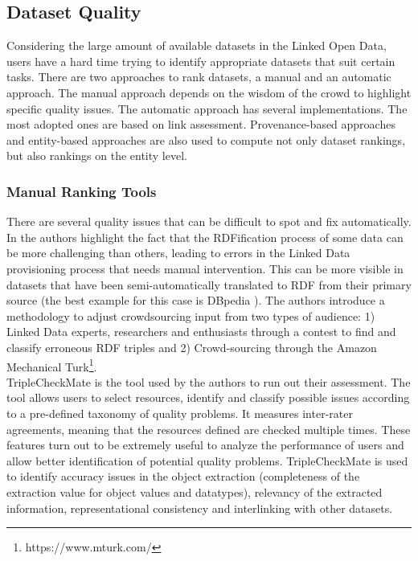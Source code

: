 \documentclass[onecolumn, crcready]{iosart2c}
\begin{document}
\subsection {Dataset Quality}
Considering the large amount of available datasets in the Linked Open Data, users have a hard time trying to identify appropriate datasets that suit certain tasks. There are two approaches to rank datasets, a manual and an automatic approach. The manual approach depends on the wisdom of the crowd to highlight specific quality issues. The automatic approach has several implementations. The most adopted ones are based on link assessment. Provenance-based approaches and entity-based approaches are also used to compute not only dataset rankings, but also rankings on the entity level.\\


\subsubsection {Manual Ranking Tools}

There are several quality issues that can be difficult to spot and fix automatically. In \cite{Acosta2013} the authors highlight the fact that the RDFification process of some data can be more challenging than others, leading to errors in the Linked Data provisioning process that needs manual intervention. This can be more visible in datasets that have been semi-automatically translated to RDF from their primary source (the best example for this case is DBpedia \cite{bizer_dbpedia_2009}). The authors introduce a methodology to adjust crowdsourcing input from two types of audience: 1) Linked Data experts, researchers and enthusiasts through a contest to find and classify erroneous RDF triples and 2) Crowd-sourcing through the Amazon Mechanical Turk\footnote{https://www.mturk.com/}.\\ TripleCheckMate \cite{Kontokostas2013} is the tool used by the authors to run out their assessment. The tool allows users to select resources, identify and classify possible issues according to a pre-defined taxonomy of quality problems. It measures inter-rater agreements, meaning that the resources defined are checked multiple times. These features turn out to be extremely useful to analyze the performance of users and allow better identification of potential quality problems. TripleCheckMate is used to identify accuracy issues in the object extraction (completeness of the extraction value for object values and datatypes), relevancy of the extracted information, representational consistency and interlinking with other datasets.\\
\end{document}
